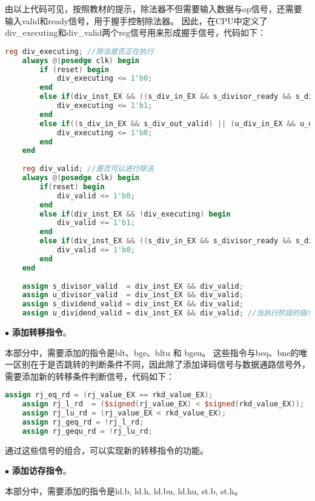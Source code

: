 \documentclass[11pt]{article}
\begin{document}
由以上代码可见，按照教材的提示，除法器不但需要输入数据与op信号，还需要输入valid和ready信号，用于握手控制除法器。
因此，在CPU中定义了div_executing和div_valid两个reg信号用来形成握手信号，代码如下：
\begin{lstlisting}[language=Verilog]
    reg div_executing; //除法是否正在执行
    always @(posedge clk) begin
        if (reset) begin
            div_executing <= 1'b0;
        end
        else if(div_inst_EX && ((s_div_in_EX && s_divisor_ready && s_dividend_ready) || (u_div_in_EX && u_divisor_ready && u_dividend_ready))) begin
            div_executing <= 1'b1;
        end
        else if((s_div_in_EX && s_div_out_valid) || (u_div_in_EX && u_div_out_valid)) begin
            div_executing <= 1'b0;
        end
    end
    
    reg div_valid; //是否可以进行除法
    always @(posedge clk) begin
        if(reset) begin
            div_valid <= 1'b0;
        end
        else if(div_inst_EX && !div_executing) begin
            div_valid <= 1'b1;
        end
        else if(div_inst_EX && ((s_div_in_EX && s_divisor_ready && s_dividend_ready) || (u_div_in_EX && u_divisor_ready && u_dividend_ready))) begin
            div_valid <= 1'b0;
        end
    end
    
    assign s_divisor_valid  = div_inst_EX && div_valid;
    assign u_divisor_valid  = div_inst_EX && div_valid;
    assign s_dividend_valid = div_inst_EX && div_valid;
    assign u_dividend_valid = div_inst_EX && div_valid; //当执行阶段的指令是除法指令，且判断除法指令可以执行时，拉高握手信号
\end{lstlisting}

\noindent
$\bullet$
\textbf{添加转移指令}。

本部分中，需要添加的指令是blt、bge、bltu 和 bgeu。
这些指令与beq、bne的唯一区别在于是否跳转的判断条件不同，因此除了添加译码信号与数据通路信号外，需要添加新的转移条件判断信号，代码如下：
\begin{lstlisting}[language=Verilog]
    assign rj_eq_rd = (rj_value_EX == rkd_value_EX);
    assign rj_l_rd  = ($signed(rj_value_EX) < $signed(rkd_value_EX));
    assign rj_lu_rd = (rj_value_EX < rkd_value_EX);
    assign rj_geq_rd = !rj_l_rd;
    assign rj_gequ_rd = !rj_lu_rd;
\end{lstlisting}
通过这些信号的组合，可以实现新的转移指令的功能。

\noindent
$\bullet$
\textbf{添加访存指令}。

本部分中，需要添加的指令是ld.b, ld.h, ld.bu, ld.hu, st.b, st.h。
\end{document}
